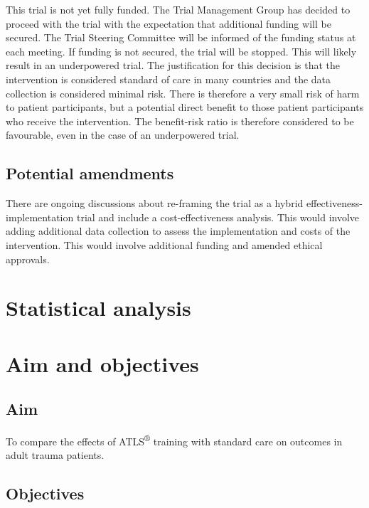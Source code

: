 \documentclass[
]{scrartcl}
\begin{document}
This trial is not yet fully funded. The Trial Management Group has
decided to proceed with the trial with the expectation that additional
funding will be secured. The Trial Steering Committee will be informed
of the funding status at each meeting. If funding is not secured, the
trial will be stopped. This will likely result in an underpowered trial.
The justification for this decision is that the intervention is
considered standard of care in many countries and the data collection is
considered minimal risk. There is therefore a very small risk of harm to
patient participants, but a potential direct benefit to those patient
participants who receive the intervention. The benefit-risk ratio is
therefore considered to be favourable, even in the case of an
underpowered trial.

\hypertarget{potential-amendments}{%
\subsection{Potential amendments}\label{potential-amendments}}

There are ongoing discussions about re-framing the trial as a hybrid
effectiveness-implementation trial and include a cost-effectiveness
analysis. This would involve adding additional data collection to assess
the implementation and costs of the intervention. This would involve
additional funding and amended ethical approvals.

\newpage{}

\hypertarget{statistical-analysis}{%
\section{Statistical analysis}\label{statistical-analysis}}

\hypertarget{aim-and-objectives}{%
\section{Aim and objectives}\label{aim-and-objectives}}

\hypertarget{aim}{%
\subsection{Aim}\label{aim}}

To compare the effects of ATLS\textsuperscript{®} training with standard
care on outcomes in adult trauma patients.

\hypertarget{objectives}{%
\subsection{Objectives}\label{objectives}}
\end{document}
